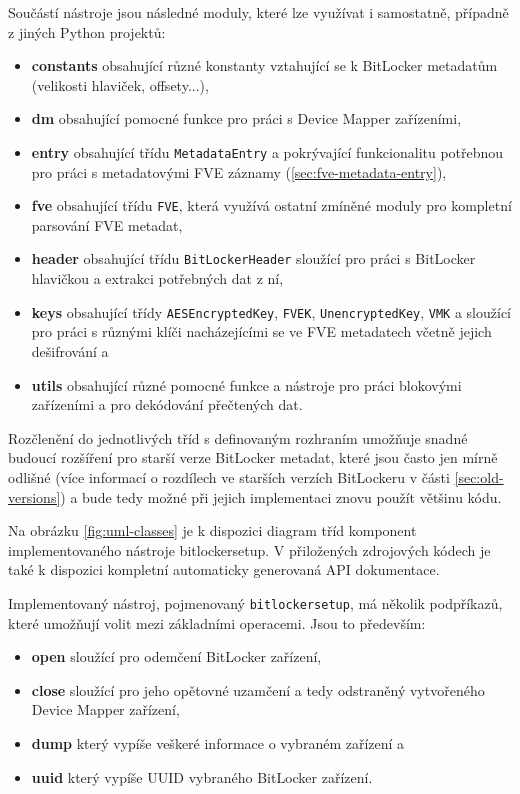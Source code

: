 Součástí nástroje jsou následné moduly, které lze využívat i samostatně, případně z jiných Python projektů:

\begin{itemize}
	\item \textbf{constants} obsahující různé konstanty vztahující se k BitLocker metadatům (velikosti hlaviček, offsety...),
	\item \textbf{dm} obsahující pomocné funkce pro práci s Device Mapper zařízeními,
	\item \textbf{entry} obsahující třídu \texttt{MetadataEntry} a pokrývající funkcionalitu potřebnou pro práci s metadatovými FVE záznamy (\ref{sec:fve-metadata-entry}),
	\item \textbf{fve} obsahující třídu \texttt{FVE}, která využívá ostatní zmíněné moduly pro kompletní parsování FVE metadat,
	\item \textbf{header} obsahující třídu \texttt{BitLockerHeader} sloužící pro práci s BitLocker hlavičkou a extrakci potřebných dat z ní,
	\item \textbf{keys} obsahující třídy \texttt{AESEncryptedKey}, \texttt{FVEK}, \texttt{UnencryptedKey}, \texttt{VMK} a sloužící pro práci s různými klíči nacházejícími se ve FVE metadatech včetně jejich dešifrování a
	\item \textbf{utils} obsahující různé pomocné funkce a nástroje pro práci blokovými zařízeními a pro dekódování přečtených dat.
\end{itemize}

Rozčlenění do jednotlivých tříd s definovaným rozhraním umožňuje snadné budoucí rozšíření pro starší verze BitLocker metadat, které jsou často jen mírně odlišné (více informací o rozdílech ve starších verzích BitLockeru v části \ref{sec:old-versions}) a bude tedy možné při jejich implementaci znovu použít většinu kódu.

Na obrázku \ref{fig:uml-classes} je k dispozici diagram tříd komponent implementovaného nástroje bitlockersetup. V přiložených zdrojových kódech je také k dispozici kompletní automaticky generovaná API dokumentace.



Implementovaný nástroj, pojmenovaný \texttt{bitlockersetup}, má několik podpříkazů, které umožňují volit mezi základními operacemi. Jsou to především:

\begin{itemize}
	\item \textbf{open} sloužící pro odemčení BitLocker zařízení,
	\item \textbf{close} sloužící pro jeho opětovné uzamčení a tedy odstraněný vytvořeného Device Mapper zařízení,
	\item \textbf{dump} který vypíše veškeré informace o vybraném zařízení a
	\item \textbf{uuid} který vypíše UUID vybraného BitLocker zařízení.
\end{itemize}

